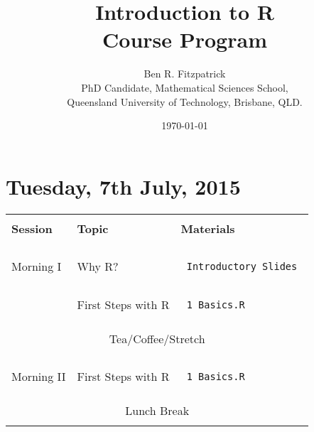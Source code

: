 \documentclass{article}[12pt]
\begin{document}
\title{\huge Introduction to R\\
\large Course Program}
\author{Ben R. Fitzpatrick\\ 
\small PhD Candidate, Mathematical Sciences School,\\
\small Queensland University of Technology, Brisbane, QLD.}
\date{\today}
\maketitle

\clearpage
\section*{Tuesday, 7th July, 2015}
\begin{table}[h!]
\begin{tabular}{ |p{2cm}|p{4cm}|p{7cm}| }
\hline
                               &                              & \\
\textbf{Session}               & \textbf{Topic}               & \textbf{Materials} \\ 
                               &                              & \\ \hline \hline
 & & \\
Morning I                      & Why R?                       & \begin{verbatim} Introductory_Slides \end{verbatim} \\
                               & First Steps with R           & \begin{verbatim} 1_Basics.R \end{verbatim} \\ \hline
\multicolumn{3}{c}{} \\
\multicolumn{3}{c}{Tea/Coffee/Stretch}  \\ 
\multicolumn{3}{c}{} \\\hline
 & & \\
Morning II                     & First Steps with R           & \begin{verbatim} 1_Basics.R \end{verbatim} \\ \hline
\multicolumn{3}{c}{} \\
\multicolumn{3}{c}{Lunch Break}  \\ 
\multicolumn{3}{c}{} \\\hline



\end{tabular}
\end{table}
\end{document}
